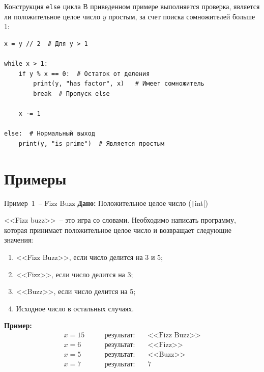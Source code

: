 \documentclass[aspectratio=169]{beamer}	%
\begin{document}
\begin{frame}[fragile]{Конструкция \texttt{else} цикла}
\scriptsize
В приведенном примере выполняется проверка, является ли положительное целое число $y$ простым, за счет поиска сомножителей больше 1:

\begin{verbatim}
x = y // 2  # Для y > 1

while x > 1: 
    if y % x == 0:  # Остаток от деления
        print(y, "has factor", x)   # Имеет сомножитель
        break  # Пропуск else
    
    x -= 1

else:  # Нормальный выход
    print(y, "is prime")  # Является простым  
\end{verbatim}
\vfill
\end{frame}


\section{Примеры}
\sectionframe


\begin{frame}[fragile]{Пример~1~-- Fizz Buzz}
\scriptsize
\textbf{Дано:} Положительное целое число (\texttt|int|) 

\bigskip
<<Fizz buzz>>~-- это игра со словами. Необходимо написать программу, которая принимает положительное целое число и возвращает следующие значения:

\begin{enumerate}
	\item {<<Fizz Buzz>>}, если число делится на 3 и 5;
	\item {<<Fizz>>}, если число делится на 3;
	\item {<<Buzz>>}, если число делится на 5;
	\item Исходное число в остальных случаях.
\end{enumerate}

\bigskip
\textbf{Пример:}
$$
\begin{aligned}
	x = 15 & \qquad \text{результат:} & \quad \text{<<Fizz Buzz>>} \\
	x = 6 & \qquad \text{результат:} & \quad \text{<<Fizz>>} \\
	x = 5 & \qquad \text{результат:} & \quad \text{<<Buzz>>} \\
	x = 7 & \qquad \text{результат:} & \quad 7 \\
\end{aligned}
$$
\vfill
\end{frame}
\end{document}
